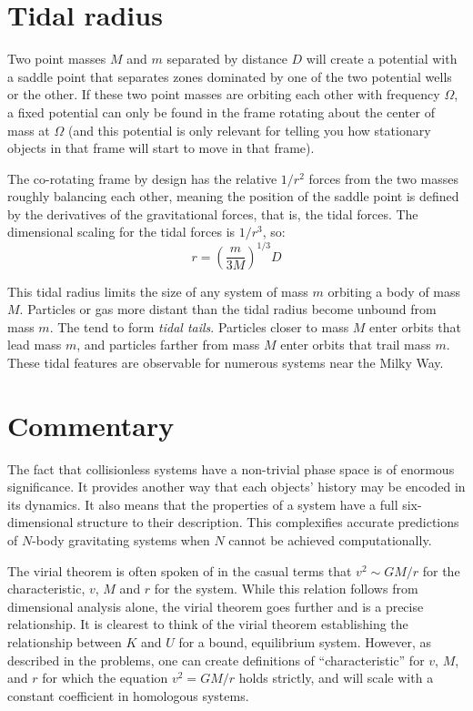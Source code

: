 \section{Tidal radius}

Two point masses $M$ and $m$ separated by distance $D$ will create a
potential with a saddle point that separates zones dominated by one of
the two potential wells or the other.  If these two point masses are
orbiting each other with frequency $\Omega$, a fixed potential can
only be found in the frame rotating about the center of mass at
$\Omega$ (and this potential is only relevant for telling you how
stationary objects in that frame will start to move in that
frame).

The co-rotating frame by design has the relative $1/r^2$ forces from
the two masses roughly balancing each other, meaning the position of
the saddle point is defined by the derivatives of the gravitational
forces, that is, the tidal forces. The dimensional scaling for the
tidal forces is $1/r^3$, so:
\begin{equation}
r = \left(\frac{m}{3M}\right)^{1/3} D
\end{equation}

This tidal radius limits the size of any system of mass $m$ orbiting a
body of mass $M$. Particles or gas more distant than the tidal radius
become unbound from mass $m$. The tend to form {\it tidal
tails}. Particles closer to mass $M$ enter orbits that lead mass $m$,
and particles farther from mass $M$ enter orbits that trail mass $m$.
These tidal features are observable for numerous systems near the
Milky Way. 

\section{Commentary}

The fact that collisionless systems have a non-trivial phase space is
of enormous significance. It provides another way that each objects'
history may be encoded in its dynamics. It also means that the
properties of a system have a full six-dimensional structure to their
description. This complexifies accurate predictions of $N$-body
gravitating systems when $N$ cannot be achieved computationally.

The virial theorem is often spoken of in the casual terms that
$v^2 \sim GM/r$ for the characteristic, $v$, $M$ and $r$ for the
system. While this relation follows from dimensional analysis alone,
the virial theorem goes further and is a precise relationship. It is
clearest to think of the virial theorem establishing the relationship
between $K$ and $U$ for a bound, equilibrium system.  However, as
described in the problems, one can create definitions of
``characteristic'' for $v$, $M$, and $r$ for which the equation $v^2 =
GM/r$ holds strictly, and will scale with a constant coefficient in
homologous systems.

